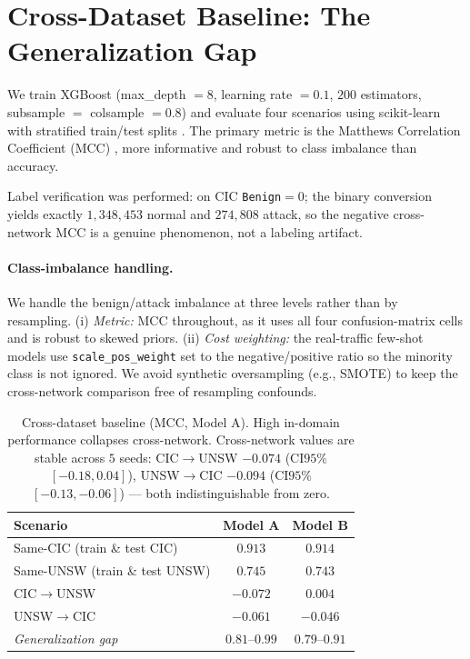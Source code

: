 \documentclass[preprint,12pt,authoryear]{elsarticle}
\begin{document}
\FloatBarrier

\section{Cross-Dataset Baseline: The Generalization Gap}
\label{sec:baseline}

We train XGBoost (max\_depth $=8$, learning rate $=0.1$, $200$ estimators,
subsample $=$ colsample $=0.8$) and evaluate four scenarios using
scikit-learn \citep{sklearn} with stratified train/test splits \citep{kohavi}. The primary metric is the Matthews Correlation Coefficient
(MCC) \citep{matthews,chicco}, more informative and robust to class imbalance than
accuracy.

Label verification was performed: on CIC \texttt{Benign}$=0$; the binary
conversion yields exactly $1{,}348{,}453$ normal and $274{,}808$ attack, so the
negative cross-network MCC is a genuine phenomenon, not a labeling artifact.

\paragraph{Class-imbalance handling.} We handle the benign/attack imbalance at three
levels rather than by resampling. (i) \emph{Metric:} MCC throughout, as it uses all
four confusion-matrix cells and is robust to skewed priors. (ii) \emph{Cost
weighting:} the real-traffic few-shot models use \texttt{scale\_pos\_weight} set to
the negative/positive ratio so the minority class is not ignored. We avoid
synthetic oversampling (e.g., SMOTE) to keep the cross-network comparison free of
resampling confounds.

\begin{table}[htbp]
\centering
\caption{Cross-dataset baseline (MCC, Model A). High in-domain performance
collapses cross-network. Cross-network values are stable across $5$ seeds:
CIC$\rightarrow$UNSW $-0.074$ (CI$95\%$ $[-0.18,0.04]$), UNSW$\rightarrow$CIC
$-0.094$ (CI$95\%$ $[-0.13,-0.06]$) --- both indistinguishable from zero.}
\label{tab:baseline}
\begin{tabular}{lcc}
\toprule
Scenario & Model A & Model B \\
\midrule
Same-CIC (train \& test CIC)   & $0.913$ & $0.914$ \\
Same-UNSW (train \& test UNSW) & $0.745$ & $0.743$ \\
CIC$\rightarrow$UNSW          & $-0.072$ & $0.004$ \\
UNSW$\rightarrow$CIC          & $-0.061$ & $-0.046$ \\
\midrule
\emph{Generalization gap}     & $0.81$--$0.99$ & $0.79$--$0.91$ \\
\bottomrule
\end{tabular}
\end{table}
\end{document}
